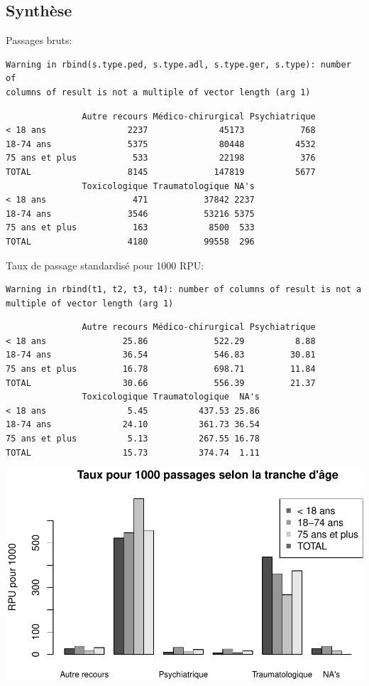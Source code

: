 \documentclass[]{article}
\begin{document}
\subsection{Synthèse}\label{synthese-1}

Passages bruts:

\begin{verbatim}
Warning in rbind(s.type.ped, s.type.adl, s.type.ger, s.type): number of
columns of result is not a multiple of vector length (arg 1)
\end{verbatim}

\begin{verbatim}
               Autre recours Médico-chirurgical Psychiatrique
< 18 ans                2237              45173           768
18-74 ans               5375              80448          4532
75 ans et plus           533              22198           376
TOTAL                   8145             147819          5677
               Toxicologique Traumatologique NA's
< 18 ans                 471           37842 2237
18-74 ans               3546           53216 5375
75 ans et plus           163            8500  533
TOTAL                   4180           99558  296
\end{verbatim}

Taux de passage standardisé pour 1000 RPU:

\begin{verbatim}
Warning in rbind(t1, t2, t3, t4): number of columns of result is not a
multiple of vector length (arg 1)
\end{verbatim}

\begin{verbatim}
               Autre recours Médico-chirurgical Psychiatrique
< 18 ans               25.86             522.29          8.88
18-74 ans              36.54             546.83         30.81
75 ans et plus         16.78             698.71         11.84
TOTAL                  30.66             556.39         21.37
               Toxicologique Traumatologique  NA's
< 18 ans                5.45          437.53 25.86
18-74 ans              24.10          361.73 36.54
75 ans et plus          5.13          267.55 16.78
TOTAL                  15.73          374.74  1.11
\end{verbatim}

\includegraphics{analyse_merge_files/figure-latex/synthese2-1.pdf}
\end{document}
